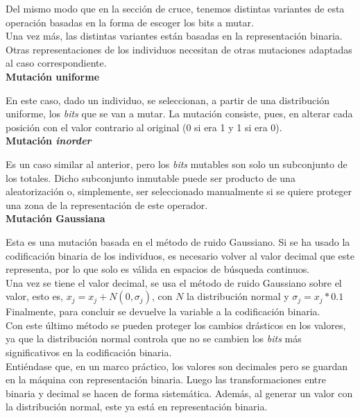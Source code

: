 			Del mismo modo que en la secci\'on de cruce, tenemos distintas variantes de esta operaci\'on basadas en la forma de escoger los bits a mutar.\\
			
			Una vez m\'as, las distintas variantes est\'an basadas en la representaci\'on binaria. Otras representaciones de los individuos necesitan de otras mutaciones adaptadas al caso correspondiente.\\
			
			\textbf{Mutaci\'on uniforme}

			En este caso, dado un individuo, se seleccionan, a partir de una distribuci\'on uniforme, los \textit{bits} que se van a mutar. La mutaci\'on consiste, pues, en alterar cada posici\'on con el valor contrario al original (0 si era 1 y 1 si era 0).\\			
		
		
			\textbf{Mutaci\'on \textit{inorder}}
		
			Es un caso similar al anterior, pero los \textit{bits} mutables son solo un subconjunto de los totales. Dicho subconjunto inmutable puede ser producto de una aleatorizaci\'on o, simplemente, ser seleccionado manualmente si se quiere proteger una zona de la representaci\'on de este operador.\\
			

			\textbf{Mutaci\'on Gaussiana}

			Esta es una mutaci\'on basada en el m\'etodo de ruido Gaussiano. Si se ha usado la codificaci\'on binaria de los individuos, es necesario volver al valor decimal que este representa, por lo que solo es v\'alida en espacios de b\'usqueda continuos.\\
			
			Una vez se tiene el valor decimal, se usa el m\'etodo de ruido Gaussiano sobre el valor, esto es, $x_j = x_j + N(0,\sigma_j)$, con $N$ la distribuci\'on normal y $\sigma_j = x_j * 0.1$\\
			
			Finalmente, para concluir se devuelve la variable a la codificaci\'on binaria.\\
			
			Con este \'ultimo m\'etodo se pueden proteger los cambios dr\'asticos en los valores, ya que la distribuci\'on normal controla que no se cambien los \textit{bits} m\'as significativos en la codificaci\'on binaria.\\
			
			Enti\'endase que, en un marco pr\'actico, los valores son decimales pero se guardan en la m\'aquina con representaci\'on binaria. Luego las transformaciones entre binaria y decimal se hacen de forma sistem\'atica. Adem\'as, al generar un valor con la distribuci\'on normal, este ya est\'a en representaci\'on binaria.\\ 
							
